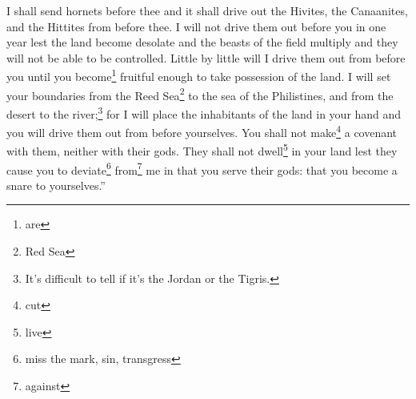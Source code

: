 \begin{enumerate}[align=center]
     I shall send hornets before thee and it shall drive out the Hivites, the Canaanites, and the Hittites from before thee.%
     I will not drive them out before you in one year lest the land become desolate and the beasts of the field multiply and they will not be able to be controlled.%
     Little by little will I drive them out from before you until you become\footnote{are} fruitful enough to take possession of the land.%
     I will set your boundaries from the Reed Sea\footnote{Red Sea} to the sea of the Philistines, and from the desert to the river;\footnote{It's difficult to tell if it's the Jordan or the Tigris.} for I will place the inhabitants of the land in your hand and you will drive them out from before yourselves.%
     You shall not make\footnote{cut} a covenant with them, neither with their gods.%
     They shall not dwell\footnote{live} in your land lest they cause you to deviate\footnote{miss the mark, sin, transgress} from\footnote{against} me in that you serve their gods: that you become a snare to yourselves.''%
\end{enumerate}

